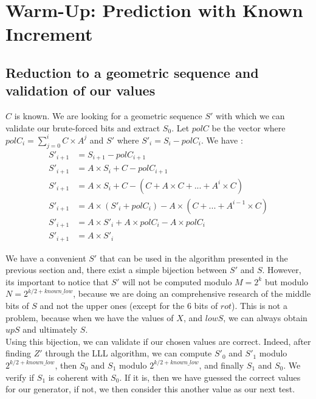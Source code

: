 \documentclass[preprint]{iacrtrans}
\begin{document}
\section{Warm-Up: Prediction with Known Increment }
\subsection{Reduction to a geometric sequence and validation of our values}

$C$ is known. We are looking for a geometric sequence $S'$ with which we can validate our brute-forced bits and extract $S_0$. Let $polC$ be the vector where $polC_i = \sum_{j=0}^{i} C \times A^j$ and $S'$ where $S'_i = S_i - polC_i$. We have :
\begin{align}
    S'_{i+1} &= S_{i+1} - polC_{i+1}\\
    S'_{i+1} &= A \times S_i + C - polC_{i+1}\\
    S'_{i+1} &= A \times S_i + C - (C + A \times C + ...+ A^{i} \times C)\\
    S'_{i+1} &= A \times (S'_i + polC_i) - A \times (C + ... + A^{i-1} \times C)\\
    S'_{i+1} &= A \times S'_i + A \times polC_i - A \times polC_i\\
    S'_{i+1} &= A \times S'_i
\end{align}

We have a convenient $S'$ that can be used in the algorithm presented in the previous section and, there exist a simple bijection between $S'$ and $S$. However, its important to notice that $S'$ will not be computed modulo $M = 2^k$ but modulo $N = 2^{k/2 + known\_low}$, because we are doing an comprehensive research of the middle bits of $S$ and not the upper ones (except for the 6 bits of $rot$). This is not a problem, because when we have the values of $X$, and $lowS$, we can always obtain $upS$ and ultimately $S$.\\



Using this bijection, we can validate if our chosen values are correct. Indeed, after finding $Z'$ through the LLL algorithm, we can compute $S'_0$ and $S'_1$ modulo $2^{k/2 + known\_low}$, then $S_0$ and $S_1$ modulo $2^{k/2 + known\_low}$, and finally $S_1$ and $S_0$. We verify if $S_1$ is coherent with $S_0$. If it is, then we have guessed the correct values for our generator, if not, we then consider this another value as our next test.

\newpage
 
\end{document}

